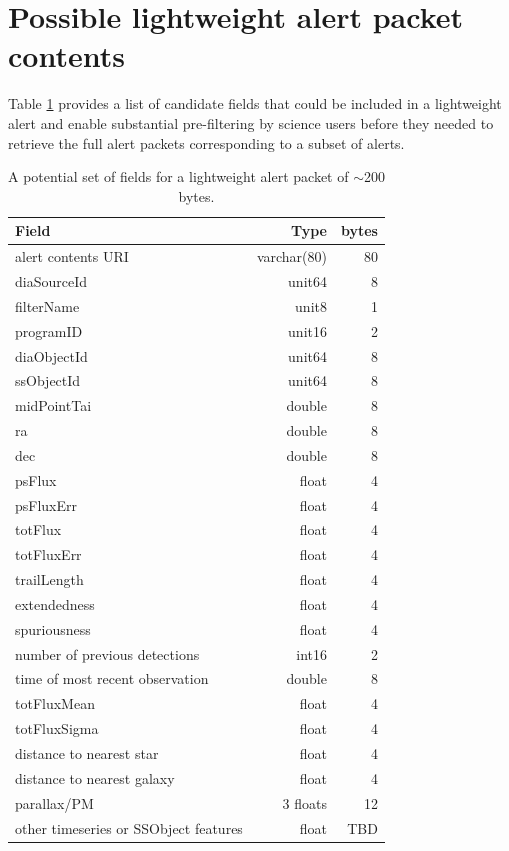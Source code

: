 \documentclass[DM,authoryear,toc]{lsstdoc}
\begin{document}


\appendix

\section{Possible lightweight alert packet contents} \label{sec:lightweight_contents}

Table \ref{tab:lightweight_alert} provides a list of candidate fields that could be included in a lightweight alert and enable substantial pre-filtering by science users before they needed to retrieve the full alert packets corresponding to a subset of alerts.

\begin{table}
  \begin{centering}
  \begin{tabular}{|l|r|r|}
    \hline
Field	& Type &	bytes \\
\hline
alert contents URI &	varchar(80)	& 80 \\
diaSourceId	&  unit64	& 8 \\
filterName &  	unit8	& 1 \\
programID	& unit16	& 2 \\
diaObjectId	& unit64 &	8 \\
ssObjectId &	unit64 &	8 \\
midPointTai &	double &	8 \\
ra &	double & 	8 \\
dec &	double & 	8 \\
psFlux &	float	& 4 \\
psFluxErr &	float	& 4 \\
totFlux	 & float &	4 \\
totFluxErr & 	float	& 4 \\
trailLength	& float	& 4 \\
extendedness & 	float & 	4 \\
spuriousness &	float	& 4 \\
number of previous detections	& int16	& 2 \\
time of most recent observation & 	double & 	8 \\
totFluxMean	& float	& 4 \\
totFluxSigma & 	float	& 4 \\
distance to nearest star & 	float	& 4 \\
distance to nearest galaxy	& float	& 4 \\
parallax/PM	& 3 floats &	12 \\
other timeseries or SSObject features & float & TBD \\
\hline
  \end{tabular}
  \caption{A potential set of fields for a lightweight alert packet of $\sim$200 bytes. \label{tab:lightweight_alert}}
\end{centering}
\end{table}
\end{document}
